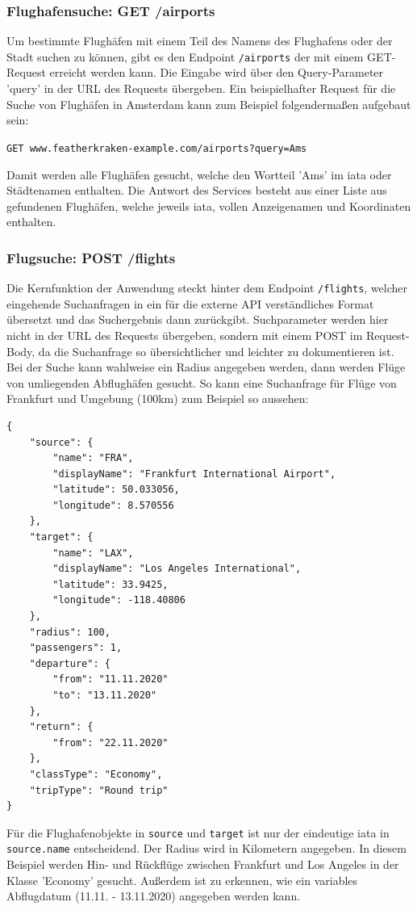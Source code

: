 \documentclass[12pt,twoside,a4paper]{article}
\begin{document}
\subsubsection[Flughafensuche]{Flughafensuche: GET /airports}
Um bestimmte Flughäfen mit einem Teil des Namens des Flughafens oder der Stadt suchen zu können, gibt es den Endpoint \texttt{/airports} der mit einem GET-Request erreicht werden kann. Die Eingabe wird über den Query-Parameter 'query' in der URL des Requests übergeben. Ein beispielhafter Request für die Suche von Flughäfen in Amsterdam kann zum Beispiel folgendermaßen aufgebaut sein:\\
\begin{center}
	\texttt{GET www.featherkraken-example.com/airports?query=Ams}
\end{center}
Damit werden alle Flughäfen gesucht, welche den Wortteil 'Ams' im \acrlong{iata} oder Städtenamen enthalten. Die Antwort des Services besteht aus einer Liste aus gefundenen Flughäfen, welche jeweils \acrlong{iata}, vollen Anzeigenamen und Koordinaten enthalten.
\subsubsection[Flugsuche]{Flugsuche: POST /flights}
Die Kernfunktion der Anwendung steckt hinter dem Endpoint \texttt{/flights}, welcher eingehende Suchanfragen in ein für die externe API verständliches Format übersetzt und das Suchergebnis dann zurückgibt. Suchparameter werden hier nicht in der URL des Requests übergeben, sondern mit einem POST im Request-Body, da die Suchanfrage so übersichtlicher und leichter zu dokumentieren ist. Bei der Suche kann wahlweise ein Radius angegeben werden, dann werden Flüge von umliegenden Abflughäfen gesucht. So kann eine Suchanfrage für Flüge von Frankfurt und Umgebung (100km) zum Beispiel so aussehen:\\
\begin{Verbatim}
{
	"source": {
		"name": "FRA",
		"displayName": "Frankfurt International Airport",
		"latitude": 50.033056,
		"longitude": 8.570556
	},
	"target": {
		"name": "LAX",
		"displayName": "Los Angeles International",
		"latitude": 33.9425,
		"longitude": -118.40806
	},
	"radius": 100,
	"passengers": 1,
	"departure": {
		"from": "11.11.2020"
		"to": "13.11.2020"
	},
	"return": {
		"from": "22.11.2020"
	},
	"classType": "Economy",
	"tripType": "Round trip"
}
\end{Verbatim}
Für die Flughafenobjekte in \texttt{source} und \texttt{target} ist nur der eindeutige \acrlong{iata} in \texttt{source.name} entscheidend. Der Radius wird in Kilometern angegeben. In diesem Beispiel werden Hin- und Rückflüge zwischen Frankfurt und Los Angeles in der Klasse 'Economy' gesucht. Außerdem ist zu erkennen, wie ein variables Abflugdatum (11.11. - 13.11.2020) angegeben werden kann.
\end{document}
